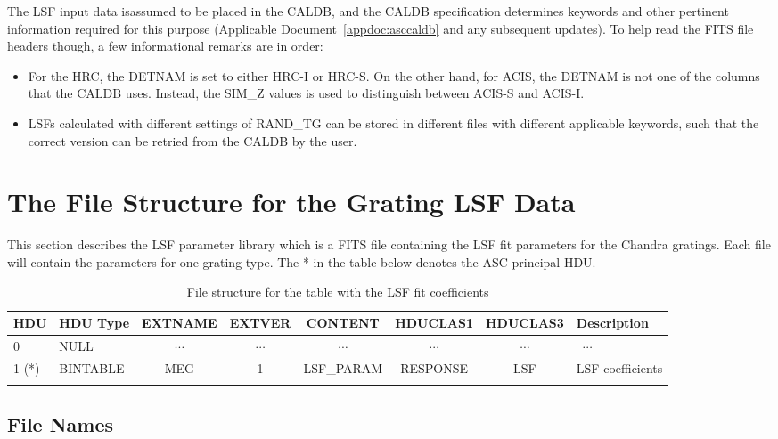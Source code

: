 \documentclass[twoside]{article}
\def\nodata{ ~$\cdots$~ }
\begin{document}
The LSF input data isassumed to be placed in the CALDB, and the CALDB
specification determines keywords and other pertinent information
required for this purpose (Applicable Document~\ref{appdoc:asccaldb}
and any subsequent updates). To help read the FITS file headers
though, a few informational remarks are in order:

\begin{itemize}
  \item For the HRC, the DETNAM is set to either HRC-I or HRC-S. On
    the other hand, for ACIS, the DETNAM is not one of the columns
    that the CALDB uses. Instead, the SIM\_Z values is used to
    distinguish between ACIS-S and ACIS-I.
  \item LSFs calculated with different settings of RAND\_TG can be
    stored in different files with different applicable keywords, such
    that the correct version can be retried from the CALDB by the
    user.
\end{itemize}


\section{The File Structure for the Grating LSF Data}

This section describes the LSF parameter library which is a FITS file
containing the LSF fit parameters for the Chandra gratings. Each file
will contain the parameters for one grating type.  The * in the table
below denotes the ASC principal HDU.

\begin{table}[h]
{\footnotesize
\noindent\begin{tabular}{|llcccccp{1.2in}|}\hline
HDU
& \sc HDU Type
& \sc EXTNAME
& \sc EXTVER
& \sc CONTENT
& \sc HDUCLAS1
& \sc HDUCLAS3
& Description
\\
\hline
%
0
& \sc NULL
& \nodata
& \nodata
& \nodata
& \nodata
& \nodata
& \nodata
\\
%
1 (*)
& \sc BINTABLE
& \sc MEG
& 1
& \sc LSF\_PARAM
& RESPONSE
& \sc LSF
& LSF coefficients
\\
%
\\\hline
%
\end{tabular}
}%
\caption{File structure for the table with the LSF fit coefficients}
\label{tab:fstruct}
\end{table}
%

\subsection{File Names}
\end{document}

